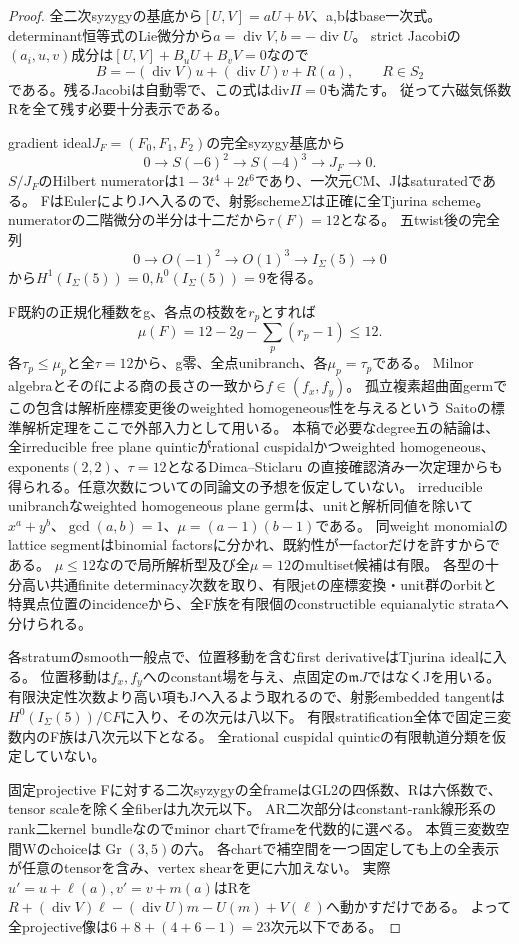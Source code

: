 \documentclass[a4paper,11pt]{ltjsarticle}
\theoremstyle{definition}
\begin{document}
\begin{proof}
全二次syzygyの基底から$[U,V]=aU+bV$、a,bはbase一次式。
determinant恒等式のLie微分から$a=\operatorname{div}V,b=-\operatorname{div}U$。
strict Jacobiの$(a_i,u,v)$成分は$[U,V]+B_uU+B_vV=0$なので
\[
 B=-(\operatorname{div}V)u+(\operatorname{div}U)v+R(a),
 \qquad R\in S_2
\]
である。残るJacobiは自動零で、この式はdiv$\Pi=0$も満たす。
従って六磁気係数Rを全て残す必要十分表示である。

gradient ideal$J_F=(F_0,F_1,F_2)$の完全syzygy基底から
\[
 0\longrightarrow S(-6)^2\longrightarrow S(-4)^3\longrightarrow J_F\longrightarrow0.
\]
$S/J_F$のHilbert numeratorは$1-3t^4+2t^6$であり、一次元CM、Jはsaturatedである。
FはEulerによりJへ入るので、射影scheme$\Sigma$は正確に全Tjurina scheme。
numeratorの二階微分の半分は十二だから$\tau(F)=12$となる。
五twist後の完全列
\[
 0\longrightarrow O(-1)^2\longrightarrow O(1)^3\longrightarrow I_\Sigma(5)\longrightarrow0
\]
から$H^1(I_\Sigma(5))=0,h^0(I_\Sigma(5))=9$を得る。

F既約の正規化種数をg、各点の枝数を$r_p$とすれば
\[
 \mu(F)=12-2g-\sum_p(r_p-1)\le12.
\]
各$\tau_p\le\mu_p$と全$\tau=12$から、g零、全点unibranch、各$\mu_p=\tau_p$である。
Milnor algebraとそのfによる商の長さの一致から$f\in(f_x,f_y)$。
孤立複素超曲面germでこの包含は解析座標変更後のweighted homogeneous性を与えるという
Saitoの標準解析定理\cite{saito1971}をここで外部入力として用いる。
本稿で必要なdegree五の結論は、全irreducible free plane quinticがrational cuspidalかつweighted homogeneous、
exponents$(2,2)$、$\tau=12$となるDimca--Sticlaru\cite[Theorem 2.8(i), p.6; proof p.7]{dimcasticlaru}
の直接確認済み一次定理からも得られる。任意次数についての同論文の予想を仮定していない。
irreducible unibranchなweighted homogeneous plane germは、unitと解析同値を除いて
$x^a+y^b$、$\gcd(a,b)=1$、$\mu=(a-1)(b-1)$である。
同weight monomialのlattice segmentはbinomial factorsに分かれ、既約性が一factorだけを許すからである。
$\mu\le12$なので局所解析型及び全$\mu=12$のmultiset候補は有限。
各型の十分高い共通finite determinacy次数を取り、有限jetの座標変換・unit群のorbitと
特異点位置のincidenceから、全F族を有限個のconstructible equianalytic strataへ分けられる。

各stratumのsmooth一般点で、位置移動を含むfirst derivativeはTjurina idealに入る。
位置移動は$f_x,f_y$へのconstant場を与え、点固定の$\mathfrak m J$ではなくJを用いる。
有限決定性次数より高い項もJへ入るよう取れるので、射影embedded tangentは
$H^0(I_\Sigma(5))/\mathbb CF$に入り、その次元は八以下。
有限stratification全体で固定三変数内のF族は八次元以下となる。
全rational cuspidal quinticの有限軌道分類を仮定していない。

固定projective Fに対する二次syzygyの全frameはGL2の四係数、Rは六係数で、
tensor scaleを除く全fiberは九次元以下。
AR二次部分はconstant-rank線形系のrank二kernel bundleなのでminor chartでframeを代数的に選べる。
本質三変数空間Wのchoiceは$\operatorname{Gr}(3,5)$の六。
各chartで補空間を一つ固定しても上の全表示が任意のtensorを含み、vertex shearを更に六加えない。
実際$u'=u+\ell(a),v'=v+m(a)$はRを
$R+(\operatorname{div}V)\ell-(\operatorname{div}U)m-U(m)+V(\ell)$へ動かすだけである。
よって全projective像は$6+8+(4+6-1)=23$次元以下である。
\end{proof}
\end{document}
